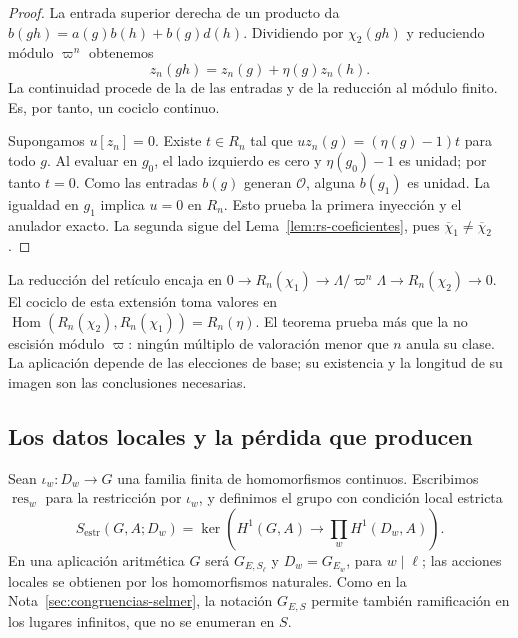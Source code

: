 \begin{proof}
La entrada superior derecha de un producto da
$b(gh)=a(g)b(h)+b(g)d(h)$. Dividiendo por $\chi_2(gh)$ y
reduciendo módulo $\varpi^n$ obtenemos
\[
 z_n(gh)=z_n(g)+\eta(g)z_n(h).
\]
La continuidad procede de la de las entradas y de la reducción
al módulo finito. Es, por tanto, un cociclo continuo.

Supongamos $u[z_n]=0$. Existe $t\in R_n$ tal que
$u z_n(g)=(\eta(g)-1)t$ para todo $g$.
Al evaluar en $g_0$, el lado izquierdo es cero y
$\eta(g_0)-1$ es unidad; por tanto $t=0$.
Como las entradas $b(g)$ generan $\mathcal O$, alguna $b(g_1)$
es unidad. La igualdad en $g_1$ implica $u=0$ en $R_n$.
Esto prueba la primera inyección y el anulador exacto.
La segunda sigue del Lema~\ref{lem:rs-coeficientes}, pues
$\overline\chi_1\ne\overline\chi_2$.
\end{proof}

La reducción del retículo encaja en
$0\to R_n(\chi_1)\to\Lambda/\varpi^n\Lambda
\to R_n(\chi_2)\to0$. El cociclo de esta extensión toma valores
en $\operatorname{Hom}(R_n(\chi_2),R_n(\chi_1))=R_n(\eta)$.
El teorema prueba más que la no escisión módulo $\varpi$:
ningún múltiplo de valoración menor que $n$ anula su clase.
La aplicación depende de las elecciones de base; su existencia
y la longitud de su imagen son las conclusiones necesarias.

\subsection{Los datos locales y la pérdida que producen}

Sean $\iota_w:D_w\to G$ una familia finita de homomorfismos
continuos. Escribimos $\operatorname{res}_w$ para la restricción
por $\iota_w$, y definimos el grupo con condición local estricta
\begin{equation}
 S_{\mathrm{estr}}(G,A;D_w)=
 \ker\!\left(H^1(G,A)\longrightarrow\prod_w H^1(D_w,A)\right).
 \label{eq:rs-selmer-estricto}
\end{equation}
En una aplicación aritmética $G$ será $G_{E,S_\ell}$ y
$D_w=G_{E_w}$, para $w\mid\ell$; las acciones locales se
obtienen por los homomorfismos naturales. Como en la
Nota~\ref{sec:congruencias-selmer}, la notación $G_{E,S}$
permite también ramificación en los lugares infinitos, que no
se enumeran en $S$.

